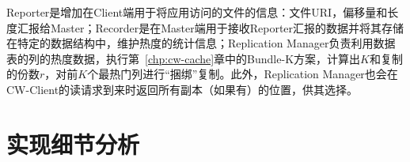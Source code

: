 \par Reporter是增加在Client端用于将应用访问的文件的信息：文件URI，偏移量和长度汇报给Master；Recorder是在Master端用于接收Reporter汇报的数据并将其存储在特定的数据结构中，维护热度的统计信息；Replication Manager负责利用数据表的列的热度数据，执行第~\ref{chp:cw-cache}章中的Bundle-K方案，计算出$K$和复制的份数$r$，对前$K$个最热门列进行“捆绑”复制。此外，Replication Manager也会在CW-Client的读请求到来时返回所有副本（如果有）的位置，供其选择。

\section{实现细节分析}